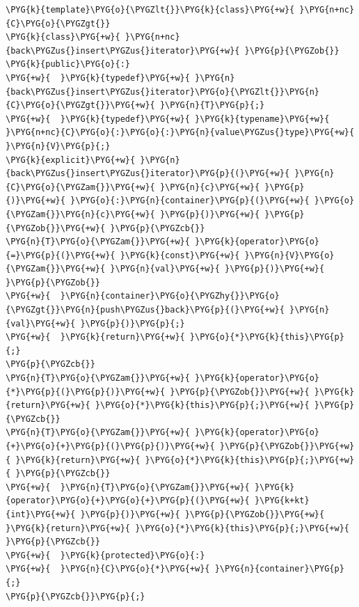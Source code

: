 \begin{codeblockbg}
\begin{Verbatim}[commandchars=\\\{\},breaklines=true,breakanywhere=true,fontsize=\codefont,xleftmargin=17bp]
\PYG{k}{template}\PYG{o}{\PYGZlt{}}\PYG{k}{class}\PYG{+w}{ }\PYG{n+nc}{C}\PYG{o}{\PYGZgt{}}
\PYG{k}{class}\PYG{+w}{ }\PYG{n+nc}{back\PYGZus{}insert\PYGZus{}iterator}\PYG{+w}{ }\PYG{p}{\PYGZob{}}
\PYG{k}{public}\PYG{o}{:}
\PYG{+w}{  }\PYG{k}{typedef}\PYG{+w}{ }\PYG{n}{back\PYGZus{}insert\PYGZus{}iterator}\PYG{o}{\PYGZlt{}}\PYG{n}{C}\PYG{o}{\PYGZgt{}}\PYG{+w}{ }\PYG{n}{T}\PYG{p}{;}
\PYG{+w}{  }\PYG{k}{typedef}\PYG{+w}{ }\PYG{k}{typename}\PYG{+w}{ }\PYG{n+nc}{C}\PYG{o}{:}\PYG{o}{:}\PYG{n}{value\PYGZus{}type}\PYG{+w}{ }\PYG{n}{V}\PYG{p}{;}
\PYG{k}{explicit}\PYG{+w}{ }\PYG{n}{back\PYGZus{}insert\PYGZus{}iterator}\PYG{p}{(}\PYG{+w}{ }\PYG{n}{C}\PYG{o}{\PYGZam{}}\PYG{+w}{ }\PYG{n}{c}\PYG{+w}{ }\PYG{p}{)}\PYG{+w}{ }\PYG{o}{:}\PYG{n}{container}\PYG{p}{(}\PYG{+w}{ }\PYG{o}{\PYGZam{}}\PYG{n}{c}\PYG{+w}{ }\PYG{p}{)}\PYG{+w}{ }\PYG{p}{\PYGZob{}}\PYG{+w}{ }\PYG{p}{\PYGZcb{}}
\PYG{n}{T}\PYG{o}{\PYGZam{}}\PYG{+w}{ }\PYG{k}{operator}\PYG{o}{=}\PYG{p}{(}\PYG{+w}{ }\PYG{k}{const}\PYG{+w}{ }\PYG{n}{V}\PYG{o}{\PYGZam{}}\PYG{+w}{ }\PYG{n}{val}\PYG{+w}{ }\PYG{p}{)}\PYG{+w}{ }\PYG{p}{\PYGZob{}}
\PYG{+w}{  }\PYG{n}{container}\PYG{o}{\PYGZhy{}}\PYG{o}{\PYGZgt{}}\PYG{n}{push\PYGZus{}back}\PYG{p}{(}\PYG{+w}{ }\PYG{n}{val}\PYG{+w}{ }\PYG{p}{)}\PYG{p}{;}
\PYG{+w}{  }\PYG{k}{return}\PYG{+w}{ }\PYG{o}{*}\PYG{k}{this}\PYG{p}{;}
\PYG{p}{\PYGZcb{}}
\PYG{n}{T}\PYG{o}{\PYGZam{}}\PYG{+w}{ }\PYG{k}{operator}\PYG{o}{*}\PYG{p}{(}\PYG{p}{)}\PYG{+w}{ }\PYG{p}{\PYGZob{}}\PYG{+w}{ }\PYG{k}{return}\PYG{+w}{ }\PYG{o}{*}\PYG{k}{this}\PYG{p}{;}\PYG{+w}{ }\PYG{p}{\PYGZcb{}}
\PYG{n}{T}\PYG{o}{\PYGZam{}}\PYG{+w}{ }\PYG{k}{operator}\PYG{o}{+}\PYG{o}{+}\PYG{p}{(}\PYG{p}{)}\PYG{+w}{ }\PYG{p}{\PYGZob{}}\PYG{+w}{ }\PYG{k}{return}\PYG{+w}{ }\PYG{o}{*}\PYG{k}{this}\PYG{p}{;}\PYG{+w}{ }\PYG{p}{\PYGZcb{}}
\PYG{+w}{  }\PYG{n}{T}\PYG{o}{\PYGZam{}}\PYG{+w}{ }\PYG{k}{operator}\PYG{o}{+}\PYG{o}{+}\PYG{p}{(}\PYG{+w}{ }\PYG{k+kt}{int}\PYG{+w}{ }\PYG{p}{)}\PYG{+w}{ }\PYG{p}{\PYGZob{}}\PYG{+w}{ }\PYG{k}{return}\PYG{+w}{ }\PYG{o}{*}\PYG{k}{this}\PYG{p}{;}\PYG{+w}{ }\PYG{p}{\PYGZcb{}}
\PYG{+w}{  }\PYG{k}{protected}\PYG{o}{:}
\PYG{+w}{  }\PYG{n}{C}\PYG{o}{*}\PYG{+w}{ }\PYG{n}{container}\PYG{p}{;}
\PYG{p}{\PYGZcb{}}\PYG{p}{;}
\end{Verbatim}
\end{codeblockbg}



